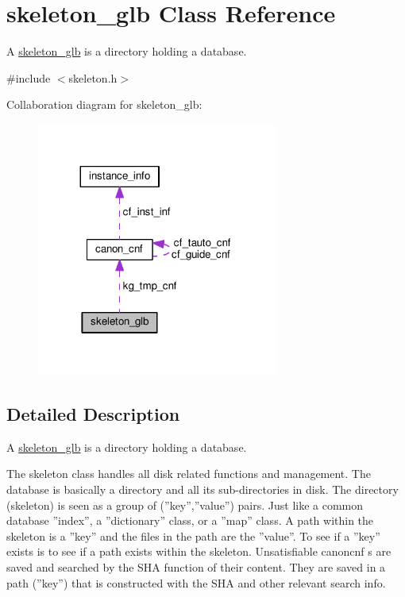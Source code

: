 \hypertarget{classskeleton__glb}{\section{skeleton\+\_\+glb Class Reference}
\label{classskeleton__glb}
}


A \hyperlink{classskeleton__glb}{skeleton\+\_\+glb} is a directory holding a database.  




{\ttfamily \#include $<$skeleton.\+h$>$}



Collaboration diagram for skeleton\+\_\+glb\+:\nopagebreak
\begin{figure}[H]
\begin{center}
\leavevmode
\includegraphics[width=224pt]{d8/d37/classskeleton__glb__coll__graph}
\end{center}
\end{figure}


\subsection{Detailed Description}
A \hyperlink{classskeleton__glb}{skeleton\+\_\+glb} is a directory holding a database. 

The skeleton class handles all disk related functions and management. The database is basically a directory and all its sub-\/directories in disk. The directory (skeleton) is seen as a group of (''key'',''value'') pairs. Just like a common database ''index'', a ''dictionary'' class, or a ''map'' class. A path within the skeleton is a ''key'' and the files in the path are the ''value''. To see if a ''key'' exists is to see if a path exists within the skeleton. Unsatisfiable canoncnf s are saved and searched by the S\+H\+A function of their content. They are saved in a path (''key'') that is constructed with the S\+H\+A and other relevant search info.

